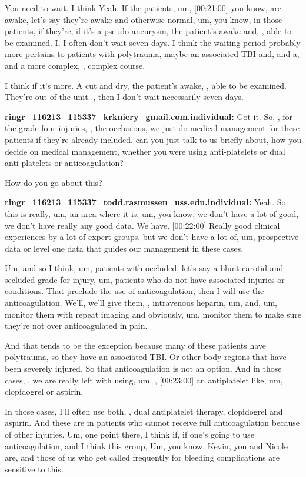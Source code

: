 \documentclass[
]{book}
\begin{document}
You need to wait. I think Yeah. If the patients, um, {[}00:21:00{]} you
know, are awake, let's say they're awake and otherwise normal, um, you
know, in those patients, if they're, if it's a pseudo aneurysm, the
patient's awake and, , able to be examined. I, I often don't wait seven
days. I think the waiting period probably more pertains to patients with
polytrauma, maybe an associated TBI and, and a, and a more complex, ,
complex course.

I think if it's more. A cut and dry, the patient's awake, , able to be
examined. They're out of the unit. , then I don't wait necessarily seven
days.

\textbf{ringr\_116213\_115337\_krkniery\_gmail.com.individual:} Got it. So, , for
the grade four injuries, , the occlusions, we just do medical management
for these patients if they're already included. can you just talk to us
briefly about, how you decide on medical management, whether you were
using anti-platelets or dual anti-platelets or anticoagulation?

How do you go about this?

\textbf{ringr\_116213\_115337\_todd.rasmussen\_uss.edu.individual:} Yeah. So this
is really, um, an area where it is, um, you know, we don't have a lot of
good, we don't have really any good data. We have. {[}00:22:00{]} Really
good clinical experiences by a lot of expert groups, but we don't have a
lot of, um, prospective data or level one data that guides our
management in these cases.

Um, and so I think, um, patients with occluded, let's say a blunt
carotid and secluded grade for injury, um, patients who do not have
associated injuries or conditions. That preclude the use of
anticoagulation, then I will use the anticoagulation. We'll, we'll give
them, , intravenous heparin, um, and, um, monitor them with repeat
imaging and obviously, um, monitor them to make sure they're not over
anticoagulated in pain.

And that tends to be the exception because many of these patients have
polytrauma, so they have an associated TBI. Or other body regions that
have been severely injured. So that anticoagulation is not an option.
And in those cases, , we are really left with using, um. , {[}00:23:00{]} an
antiplatelet like, um, clopidogrel or aspirin.

In those cases, I'll often use both, , dual antiplatelet therapy,
clopidogrel and aspirin. And these are in patients who cannot receive
full anticoagulation because of other injuries. Um, one point there, I
think if, if one's going to use anticoagulation, and I think this group,
Um, you know, Kevin, you and Nicole are, and those of us who get called
frequently for bleeding complications are sensitive to this.
\end{document}
